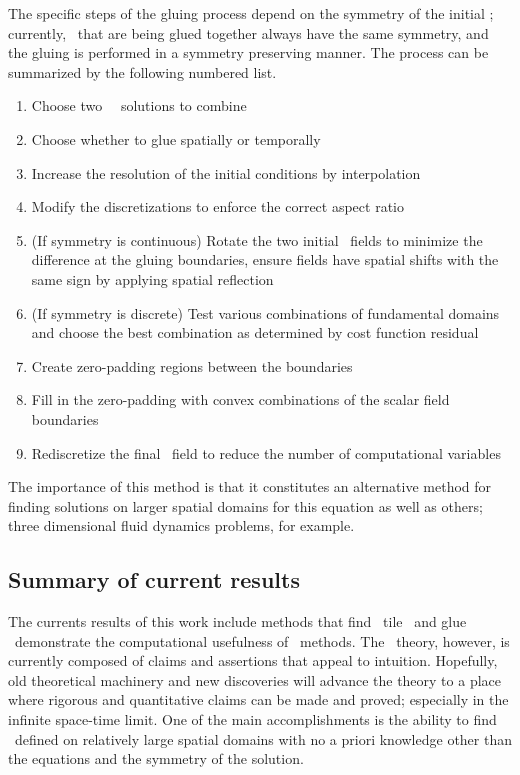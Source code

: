 The specific steps of the gluing process depend on the symmetry of the
initial \twots{}; currently, \twots\ that are being glued together always have the same symmetry,
and the gluing is performed in a symmetry preserving manner. The process can be summarized by
the following numbered list.

\begin{enumerate}
\item Choose two \spt\ \twot\ solutions to combine
\item Choose whether to glue spatially or temporally
\item Increase the resolution of the initial conditions by interpolation
\item Modify the discretizations to enforce the correct aspect ratio
\item (If symmetry is continuous) Rotate the two initial \spt\ fields
to minimize the difference at the gluing boundaries, ensure fields have spatial
shifts with the same sign by applying spatial reflection
\item (If symmetry is discrete) Test various combinations of fundamental domains
and choose the best combination as determined by cost function residual
\item Create zero-padding regions between the boundaries
\item Fill in the zero-padding with convex combinations of the scalar field boundaries
\item Rediscretize the final \spt\ field to reduce the number of computational
variables
\end{enumerate}

The importance of this method is that it constitutes an
alternative method for finding solutions on larger spatial
domains for this equation as well as others; three dimensional fluid
dynamics problems, for example.

\subsection{Summary of current results}
The currents results of this work include methods that find \twots\, tile \twots\, and
glue \twots\ demonstrate the computational usefulness of \spt\ methods.
The \spt\ theory, however, is currently composed of claims
and assertions that appeal to intuition. Hopefully, old theoretical machinery and
new discoveries will advance the theory to a place where rigorous and quantitative
claims can be made and proved; especially in the infinite space-time limit.
One of the main accomplishments
is the ability to find \twots\ defined on relatively large spatial domains with no
a priori knowledge other than the equations and the symmetry of the solution.
